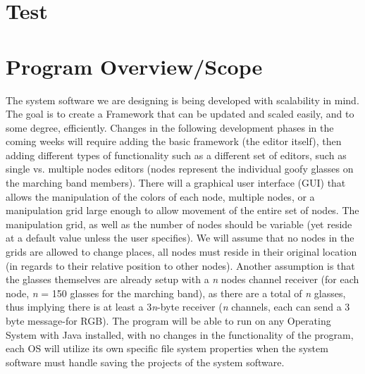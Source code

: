 \documentclass[12pt]{article}
\begin{document}
	
	\setlength{\parindent}{15pt}
	\newcommand{\forceindent}{\leavevmode{\parindent=2em\indent}}
	

	\section{Test}
	\forceindent 	
			
	\clearpage
	

	\section{Program Overview/Scope}
	\forceindent The system software we are designing is being developed with scalability in mind. The goal is to create a Framework that can be updated and scaled easily, and to some degree, efficiently. Changes in the following development phases in the coming weeks will require adding the basic framework (the editor itself), then adding different types of functionality such as a different set of editors, such as single vs. multiple nodes editors (nodes represent the individual goofy glasses on the marching band members). There will a graphical user interface (GUI) that allows the manipulation of the colors of each node, multiple nodes, or a manipulation grid large enough to allow movement of the entire set of nodes. The manipulation grid, as well as the number of nodes should be variable (yet reside at a default value unless the user specifies). We will assume that no nodes in the grids are allowed to change places, all nodes must reside in their original location (in regards to their relative position to other nodes). Another assumption is that the glasses themselves are already setup with a \textit{n} nodes channel receiver (for each node, \textit{n} = 150 glasses for the marching band), as there are a total of \textit{n} glasses, thus implying there is at least a 3\textit{n}-byte receiver (\textit{n} channels, each can send a 3 byte message-for RGB). The program will be able to run on any Operating System with Java installed, with no changes in the functionality of the program, each OS will utilize its own specific file system properties when the system software must handle saving the projects of the system software.
	
\end{document}
